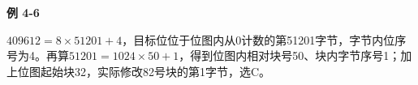 {\color{ink}\bfseries 例 4-6}\par\vspace{1bp}\(409612=\allowbreak{}8\times 51201+\allowbreak{}4\)，目标位位于位图内从0计数的第51201字节，字节内位序号为4。再算\(51201=\allowbreak{}1024\times 50+\allowbreak{}1\)，得到位图内相对块号50、块内字节序号1；加上位图起始块32，实际修改82号块的第1字节，选C。
